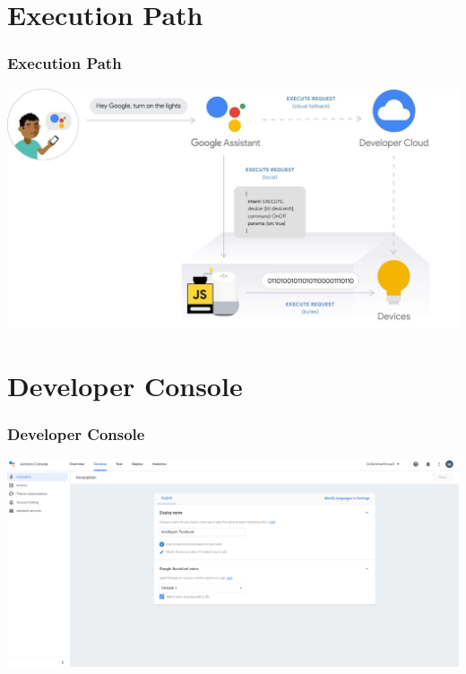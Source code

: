 \documentclass{beamer}
\begin{document}

\section{Execution Path}

\begin{frame}
\frametitle{Execution Path}
\begin{center}
\includegraphics[scale=0.2]{pictures/execution-path.png}
\end{center}
\end{frame}


\section{Developer Console}

\begin{frame}
\frametitle{Developer Console}
\begin{center}
\includegraphics[scale=0.23]{pictures/developer-console.png}
\end{center}
\end{frame}
\end{document}
